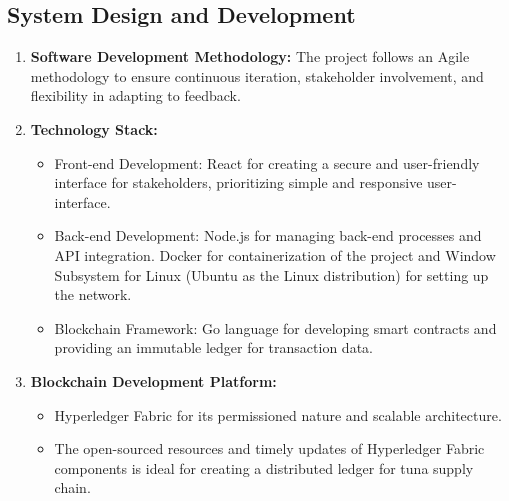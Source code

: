 \subsection{System Design and Development}

\begin{enumerate}
	\item \textbf{Software Development Methodology:} The project follows an Agile methodology to ensure continuous iteration, stakeholder involvement, and flexibility in adapting to feedback.
	\item \textbf{Technology Stack:} 
		\begin{itemize}
			\item Front-end Development: React for creating a secure and user-friendly interface for stakeholders, prioritizing simple and responsive user-interface.
			\item Back-end Development: Node.js for managing back-end processes and API integration. Docker for containerization of the project and Window Subsystem for Linux (Ubuntu as the Linux distribution) for setting up the network.
			\item Blockchain Framework: Go language for developing smart contracts and providing an immutable ledger for transaction data.
		\end{itemize}
	\item \textbf{Blockchain Development Platform:} 
		\begin{itemize}
			\item Hyperledger Fabric for its permissioned nature and scalable architecture.
			\item The open-sourced resources and timely updates of Hyperledger Fabric components is ideal for creating a distributed ledger for tuna supply chain.
		\end{itemize}
\end{enumerate}

